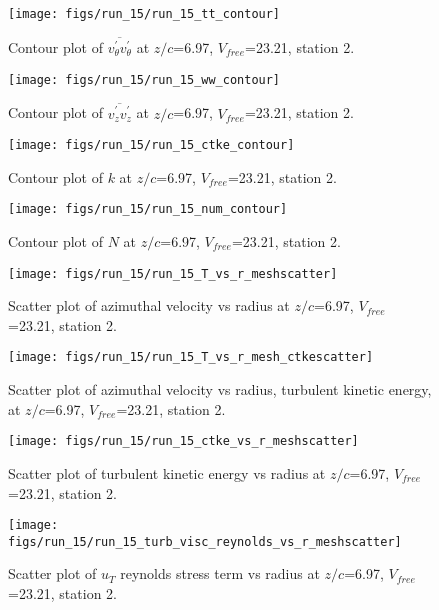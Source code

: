 \begin{figure}[H]
\centering
\texttt{[image: figs/run\_15/run\_15\_tt\_contour]}
\caption{Contour plot of $\overline{v_{\theta}^{\prime} v_{\theta}^{\prime}}$ at $z/c$=6.97, $V_{free}$=23.21, station 2.}
\end{figure}


\begin{figure}[H]
\centering
\texttt{[image: figs/run\_15/run\_15\_ww\_contour]}
\caption{Contour plot of $\overline{v_{z}^{\prime} v_{z}^{\prime}}$ at $z/c$=6.97, $V_{free}$=23.21, station 2.}
\end{figure}


\begin{figure}[H]
\centering
\texttt{[image: figs/run\_15/run\_15\_ctke\_contour]}
\caption{Contour plot of $k$ at $z/c$=6.97, $V_{free}$=23.21, station 2.}
\end{figure}


\begin{figure}[H]
\centering
\texttt{[image: figs/run\_15/run\_15\_num\_contour]}
\caption{Contour plot of $N$ at $z/c$=6.97, $V_{free}$=23.21, station 2.}
\end{figure}


\begin{figure}[H]
\centering
\texttt{[image: figs/run\_15/run\_15\_T\_vs\_r\_meshscatter]}
\caption{Scatter plot of azimuthal velocity vs radius at $z/c$=6.97, $V_{free}$=23.21, station 2.}
\end{figure}


\begin{figure}[H]
\centering
\texttt{[image: figs/run\_15/run\_15\_T\_vs\_r\_mesh\_ctkescatter]}
\caption{Scatter plot of azimuthal velocity vs radius, turbulent kinetic energy, at $z/c$=6.97, $V_{free}$=23.21, station 2.}
\end{figure}


\begin{figure}[H]
\centering
\texttt{[image: figs/run\_15/run\_15\_ctke\_vs\_r\_meshscatter]}
\caption{Scatter plot of turbulent kinetic energy vs radius at $z/c$=6.97, $V_{free}$=23.21, station 2.}
\end{figure}


\begin{figure}[H]
\centering
\texttt{[image: figs/run\_15/run\_15\_turb\_visc\_reynolds\_vs\_r\_meshscatter]}
\caption{Scatter plot of $
u_T$ reynolds stress term vs radius at $z/c$=6.97, $V_{free}$=23.21, station 2.}
\end{figure}


